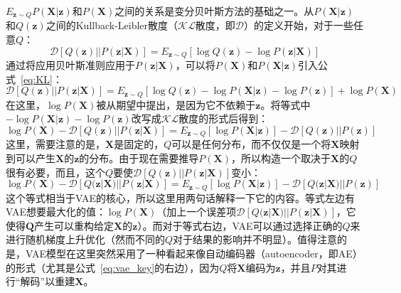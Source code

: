 $E_{\bm z\sim Q}P(\bm X|\bm z)$和$P(\bm X)$之间的关系是变分贝叶斯方法的基础之一。从$P(\bm X|\bm z)$和$Q(\bm z)$之间的Kullback-Leibler散度（$\mathcal{KL}$散度，即$\mathcal D$）的定义开始，对于一些任意$Q$：
\begin{equation}
\label{eq:KL}
\mathcal D{[Q(\bm z)||P(\bm z|\bm X)]} = E_{\bm z\sim Q}{[\log Q(\bm z)-\log P(\bm z|\bm X)]}
\end{equation}
通过将应用贝叶斯准则应用于$P(\bm z|\bm X)$，可以将$P(\bm X)$和$P(\bm X|\bm z)$引入公式~\ref{eq:KL}：
\begin{equation}
\label{eq:KL1}
\mathcal D{[Q(\bm z)||P(\bm z|\bm X)]} = E_{\bm z\sim Q}{[\log Q(\bm z)-\log P(\bm X|\bm z) - \log P(\bm z)]} + \log P(\bm X)
\end{equation}
在这里，$\log P(\bm X)$被从期望中提出，是因为它不依赖于$\bm z$。将等式中$-\log P(\bm X|\bm z) - \log P(\bm z)$改写成$\mathcal{KL}$散度的形式后得到：
\begin{equation}
\label{eq:KL2}
\log P(\bm X) - \mathcal D{[Q(\bm z)||P(\bm z|\bm X)]} = E_{\bm z\sim Q}{[\log P(\bm X|\bm z)]} - \mathcal D{[Q(\bm z)||P(\bm z)]}
\end{equation}
这里，需要注意的是，$\bm X$是固定的，$Q$可以是任何分布，而不仅仅是一个将$\bm X$映射到可以产生$\bm X$的$\bm z$的分布。由于现在需要推导$P(\bm X)$，所以构造一个取决于$\bm X$的$Q$很有必要，而且，这个$Q$要使$\mathcal D{[Q(\bm z)||P(\bm z|\bm X)]}$变小：
\begin{equation}
\label{eq:vae_key}
\log P(\bm X) - \mathcal D{[Q(\bm z|\bm X)||P(\bm z|\bm X)]} = E_{\bm z\sim Q}{[\log P(\bm X|\bm z)]} - \mathcal D{[Q(\bm z|\bm X)||P(\bm z)]}
\end{equation}
这个等式相当于VAE的核心，所以这里用两句话解释一下它的内容。等式左边有VAE想要最大化的值：$\log P(\bm X)$（加上一个误差项$\mathcal D{[Q(\bm z|\bm X)||P(\bm z|\bm X)]}$，它使得$\bm Q$产生可以重构给定$\bm X$的$\bm z$）。而对于等式右边，VAE可以通过选择正确的$Q$来进行随机梯度上升优化（然而不同的$Q$对于结果的影响并不明显）。值得注意的是，VAE模型在这里突然采用了一种看起来像自动编码器（autoencoder，即AE）的形式（尤其是公式~\ref{eq:vae_key}的右边），因为$Q$将$\bm X$编码为$\bm z$，并且$P$对其进行“解码”以重建$\bm X$。\par

